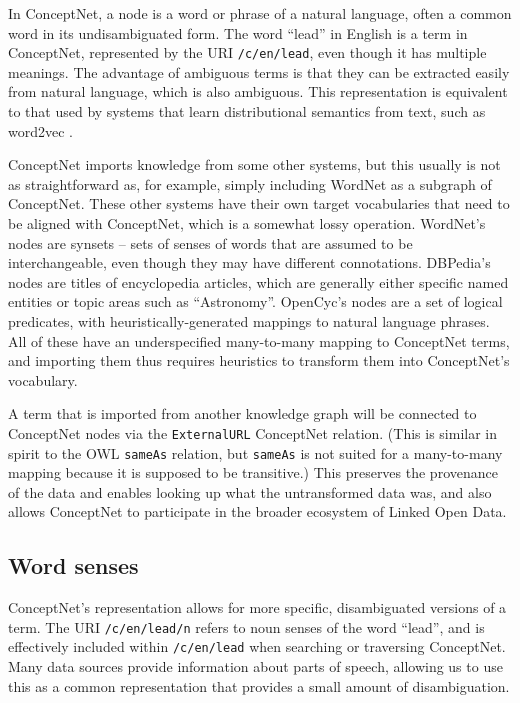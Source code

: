 \documentclass[letterpaper]{article}
\begin{document}
In ConceptNet, a node is a word or phrase of a natural language, often a
common word in its undisambiguated form. The word ``lead'' in English is
a term in ConceptNet, represented by the URI \texttt{/c/en/lead}, even
though it has multiple meanings. The advantage of ambiguous terms is
that they can be extracted easily from natural language, which is also
ambiguous. This representation is equivalent to that used by systems
that learn distributional semantics from text, such as word2vec
\cite{mikolov2013word2vec}.

ConceptNet imports knowledge from some other systems, but this usually
is not as straightforward as, for example, simply including WordNet as a
subgraph of ConceptNet. These other systems have their own target
vocabularies that need to be aligned with ConceptNet, which is a
somewhat lossy operation. WordNet's nodes are synsets -- sets of senses
of words that are assumed to be interchangeable, even though they may
have different connotations. DBPedia's nodes are titles of encyclopedia
articles, which are generally either specific named entities or topic
areas such as ``Astronomy''. OpenCyc's nodes are a set of logical
predicates, with heuristically-generated mappings to natural language
phrases. All of these have an underspecified many-to-many mapping to
ConceptNet terms, and importing them thus requires heuristics to
transform them into ConceptNet's vocabulary.

A term that is imported from another knowledge graph will be connected
to ConceptNet nodes via the \texttt{ExternalURL} ConceptNet relation.
(This is similar in spirit to the OWL \texttt{sameAs} relation, but
\texttt{sameAs} is not suited for a many-to-many mapping because it is
supposed to be transitive.) This preserves the provenance of the data
and enables looking up what the untransformed data was, and also allows
ConceptNet to participate in the broader ecosystem of Linked Open Data.

\subsection{Word senses}\label{word-senses}

ConceptNet's representation allows for more specific, disambiguated
versions of a term. The URI \texttt{/c/en/lead/n} refers to noun senses
of the word ``lead'', and is effectively included within
\texttt{/c/en/lead} when searching or traversing ConceptNet. Many data
sources provide information about parts of speech, allowing us to use
this as a common representation that provides a small amount of
disambiguation.
\end{document}
